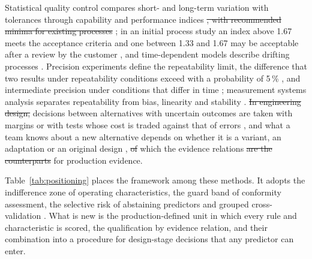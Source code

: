 \documentclass[pdflatex,sn-basic,lineno]{sn-jnl}
\providecommand{\DIFadd}[1]{{\protect\color{blue}\uwave{#1}}} %
\providecommand{\DIFdel}[1]{{\protect\color{red}\sout{#1}}}                      %
\providecommand{\DIFaddbegin}{} %
\providecommand{\DIFaddend}{} %
\providecommand{\DIFdelbegin}{} %
\providecommand{\DIFdelend}{} %
\newcommand{\DIFscaledelfig}{0.5}
\newlength{\DIFdelgraphicswidth} %
\newlength{\DIFdelgraphicsheight} %
\newcommand{\DIFaddincludegraphics}[2][]{{\color{blue}\fbox{\DIFOincludegraphics[#1]{#2}}}} %
\newcommand{\DIFdelincludegraphics}[2][]{%
\sbox{\DIFdelgraphicsbox}{\DIFOincludegraphics[#1]{#2}}%
\settoboxwidth{\DIFdelgraphicswidth}{\DIFdelgraphicsbox} %
\settoboxtotalheight{\DIFdelgraphicsheight}{\DIFdelgraphicsbox} %
\scalebox{\DIFscaledelfig}{%
\parbox[b]{\DIFdelgraphicswidth}{\usebox{\DIFdelgraphicsbox}\\[-\baselineskip] \rule{\DIFdelgraphicswidth}{0em}}\llap{\resizebox{\DIFdelgraphicswidth}{\DIFdelgraphicsheight}{%
\setlength{\unitlength}{\DIFdelgraphicswidth}%
\begin{picture}(1,1)%
\thicklines\linethickness{2pt} %
{\color[rgb]{1,0,0}\put(0,0){\framebox(1,1){}}}%
{\color[rgb]{1,0,0}\put(0,0){\line( 1,1){1}}}%
{\color[rgb]{1,0,0}\put(0,1){\line(1,-1){1}}}%
\end{picture}%
}\hspace*{3pt}}} %
} %
\DeclareRobustCommand{\DIFaddbegin}{\DIFOaddbegin \let\includegraphics\DIFaddincludegraphics} %
\DeclareRobustCommand{\DIFaddend}{\DIFOaddend \let\includegraphics\DIFOincludegraphics} %
\DeclareRobustCommand{\DIFdelbegin}{\DIFOdelbegin \let\includegraphics\DIFdelincludegraphics} %
\DeclareRobustCommand{\DIFdelend}{\DIFOaddend \let\includegraphics\DIFOincludegraphics} %
\begin{document}
Statistical quality control compares short- and long-term variation with tolerances through capability and performance indices \DIFdelbegin \DIFdel{, with recommended minima for existing processes }\DIFdelend \citep{montgomery2019introduction}; in an initial process study an index above 1.67 meets the acceptance criteria and one between 1.33 and 1.67 may be acceptable after a review by the customer \citep{aiag2006production}, and time-dependent models describe drifting processes \citep{iso2026process}. Precision experiments define the repeatability limit, the difference that two results under repeatability conditions exceed with a probability of 5\,\% \citep{iso2025repeatability}, and intermediate precision under conditions that differ in time \citep{iso2023intermediate}; measurement systems analysis separates repeatability from bias, linearity and stability \citep{aiag2010measurement}. \DIFdelbegin \DIFdel{In engineering design, }\DIFdelend \DIFaddbegin \DIFadd{Design }\DIFaddend decisions between alternatives with uncertain outcomes \citep{hazelrigg1998framework} are taken with margins \citep{eckert2019design} or with tests whose cost is traded against that of errors \citep{thomke2001sequential, salado2018mathematical}, and what a team knows about a new alternative depends on whether it is a variant, an adaptation or an original design \citep{pahl2007engineering}, \DIFdelbegin \DIFdel{of }\DIFdelend which the evidence relations \DIFdelbegin \DIFdel{are the counterparts }\DIFdelend \DIFaddbegin \DIFadd{mirror }\DIFaddend for production evidence.

Table~\ref{tab:positioning} places the framework among these methods. It adopts the indifference zone of operating characteristics, the guard band of conformity assessment, the selective risk of abstaining predictors and grouped cross-validation \citep{roberts2017cross}. What is new is the production-defined unit in which every rule and characteristic is scored, the qualification by evidence relation, and their combination into a procedure for design-stage decisions that any predictor can enter.
\end{document}
